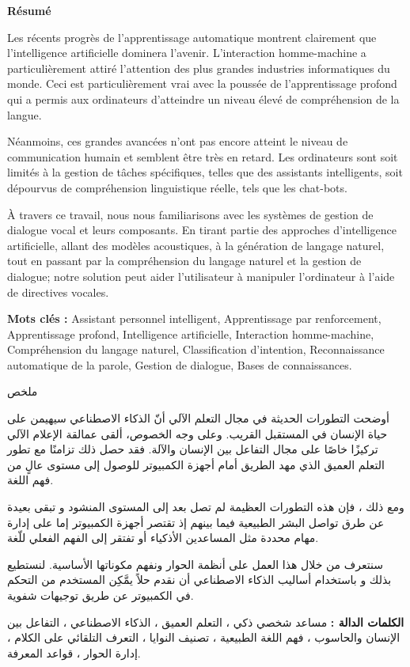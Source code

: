 \begin{center}
    \Large 
    \textbf{Résumé}
\end{center}
\setlength{\parindent}{0.4cm}
Les récents progrès de l'apprentissage automatique montrent clairement que l'intelligence artificielle dominera l'avenir.
L'interaction homme-machine a particulièrement attiré l'attention des plus grandes industries informatiques du monde. Ceci est particulièrement vrai avec la poussée de l'apprentissage profond qui a permis aux ordinateurs d'atteindre un niveau élevé de compréhension de la langue.
\par 
Néanmoins, ces grandes avancées n'ont pas encore atteint le niveau de communication humain et semblent être très en retard.
Les ordinateurs sont soit limités à la gestion de tâches spécifiques, telles que des assistants intelligents, soit dépourvus de compréhension linguistique réelle, tels que les chat-bots.
\par 
À travers ce travail, nous nous familiarisons avec les systèmes de gestion de dialogue vocal et leurs composants.
En tirant partie des approches d'intelligence artificielle, allant des modèles acoustiques, à la génération de langage naturel, tout  en passant par la compréhension du langage naturel et la  gestion de dialogue; notre solution peut aider l'utilisateur à manipuler l'ordinateur à l'aide de directives vocales.
\par
\noindent
\textbf{Mots clés :} Assistant personnel intelligent, Apprentissage par renforcement, Apprentissage profond, Intelligence artificielle, Interaction homme-machine, Compréhension du langage naturel, Classification d'intention, Reconnaissance automatique de la parole, Gestion de dialogue, Bases de connaissances.

\vspace*{0.8cm}

\begin{center}
    \Large 
    \begin{arab}
    ملخص
    \end{arab}
\end{center}
\begin{arab}
	أوضحت التطورات الحديثة في مجال التعلم الآلي أنّ الذكاء الاصطناعي سيهيمن على حياة الإنسان في المستقبل القريب. وعلى وجه الخصوص، ألقى عمالقة الإعلام الآلي تركيزًا خاصًا على مجال التفاعل بين الإنسان والآلة. فقد حصل ذلك تزامنًا مع تطور التعلم العميق الذي مهد الطريق أمام أجهزة الكمبيوتر للوصول إلى مستوى عالٍ من فهم اللغة.
	
	ومع ذلك ، فإن هذه التطورات العظيمة لم تصل بعد إلى المستوى المنشود و تبقى بعيدة عن طرق تواصل البشر الطبيعية فيما بينهم إذ تقتصر أجهزة الكمبيوتر إما على إدارة مهام محددة مثل المساعدين الأذكياء أو تفتقر إلى الفهم الفعلي للّغة.
	
	سنتعرف من خلال هذا العمل على أنظمة الحوار ونفهم مكوناتها الأساسية. لنستطيع بذلك و باستخدام أساليب الذكاء الاصطناعي أن نقدم حلاً  يمَّكِن المستخدم من التحكم في الكمبيوتر عن طريق توجيهات شفوية.
\par 
\textbf{الكلمات الدالة :} مساعد شخصي ذكي ، التعلم العميق ، الذكاء الاصطناعي ، التفاعل بين الإنسان والحاسوب ، فهم اللغة الطبيعية ، تصنيف النوايا ، التعرف التلقائي على الكلام ، إدارة الحوار ، قواعد المعرفة.
\end{arab}

